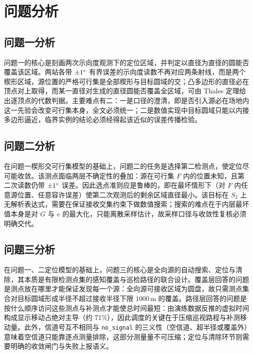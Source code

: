 \documentclass[12pt,a4paper]{ctexart}
\begin{document}
\section{问题分析}

\subsection{问题一分析}

问题一的核心是刻画两次示向度观测下的定位区域，并判定以直径为直径的圆能否覆盖该区域。两站各带 $\pm 1^{\circ}$ 有界误差的示向度读数不再对应两条射线，而是两个楔形区域，源位置的严格可行集是全部楔形与目标圆域的交；凸多边形的直径必在顶点对上取得，而某一直径对生成的直径圆能否覆盖全区域，可由 Thales 定理给出逐顶点的代数判据。主要难点有二：一是口径的澄清，即是否引入源必在场地内这一先验会改变可行集本身，全文必须统一；二是数值实现中目标圆域只能以内接多边形逼近，临界实例的结论必须经得起该近似的误差传播检验。

\subsection{问题二分析}

在问题一楔形交可行集模型的基础上，问题二的任务是选择第二检测点，使定位尽可能收敛。该测点面临两层不确定性的叠加：源在可行集 $F$ 内的位置未知，且第二次读数仍带 $\pm 1^{\circ}$ 误差。因此选点准则应是鲁棒的，即在最坏情形下（对 $F$ 内任意源位置、任意容许误差）使第二次观测后的剩余区域直径最小。该目标在 $S_2$ 上无解析表达式，需要在保证接收交集约束下做数值搜索；搜索的难点在于内层最坏值本身是对 $G$ 与 $e$ 的最大化，只能离散采样估计，故采样口径与收敛性复核必须明确交代。

\subsection{问题三分析}

在问题一、二定位模型的基础上，问题三的核心是全向源的自动搜索、定位与清除，其本质是有限检测点集的感知覆盖与巡检路径的联合设计。覆盖层回答的问题是测点放在哪里才能保证发现每一个源：全向源可接收区域为圆盘，故只需测点集合对目标圆域形成半径不超过接收半径下限 $1000\,$m 的覆盖。路径层回答的问题是按什么顺序访问这些测点与补测点才能使总时间最短：由演练数据反推的虚拟时间构成显示移动占绝对主导（约 71\%），因此调度的关键在于压缩巡视路程与补测移动量。此外，信道号互不相同与 \verb|no_signal| 的三义性（空信道、超半径或覆盖外）意味着空信道只能靠逐点测量排除，这部分测量量不可压缩；定位与清除环节则需要明确的收敛闸门与失败上报语义。
\end{document}
